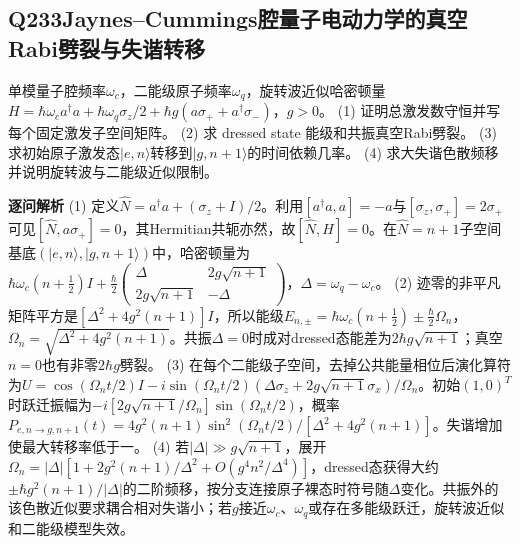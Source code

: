 \subsection*{Q233\quad Jaynes–Cummings腔量子电动力学的真空Rabi劈裂与失谐转移}
单模量子腔频率$\omega_c$，二能级原子频率$\omega_q$，旋转波近似哈密顿量$H=\hbar\omega_ca^\dagger a+\hbar\omega_q\sigma_z/2+\hbar g(a\sigma_++a^\dagger\sigma_-)$，$g>0$。
(1) 证明总激发数守恒并写每个固定激发子空间矩阵。
(2) 求 dressed state 能级和共振真空Rabi劈裂。
(3) 求初始原子激发态$|e,n\rangle$转移到$|g,n+1\rangle$的时间依赖几率。
(4) 求大失谐色散频移并说明旋转波与二能级近似限制。
\par\textbf{逐问解析}
(1) 定义$\hat N=a^\dagger a+(\sigma_z+I)/2$。利用$[a^\dagger a,a]=-a$与$[\sigma_z,\sigma_+]=2\sigma_+$可见$[\hat N,a\sigma_+]=0$，其Hermitian共轭亦然，故$[\hat N,H]=0$。在$\hat N=n+1$子空间基底$(|e,n\rangle,|g,n+1\rangle)$中，哈密顿量为$\hbar\omega_c(n+\tfrac12)I+\frac\hbar2\begin{pmatrix}\Delta&2g\sqrt{n+1}\\2g\sqrt{n+1}&-\Delta\end{pmatrix}$，$\Delta=\omega_q-\omega_c$。
(2) 迹零的非平凡矩阵平方是$[\Delta^2+4g^2(n+1)]I$，所以能级$E_{n,\pm}=\hbar\omega_c(n+\tfrac12)\pm\frac\hbar2\Omega_n$，$\Omega_n=\sqrt{\Delta^2+4g^2(n+1)}$。共振$\Delta=0$时成对dressed态能差为$2\hbar g\sqrt{n+1}$；真空$n=0$也有非零$2\hbar g$劈裂。
(3) 在每个二能级子空间，去掉公共能量相位后演化算符为$U=\cos(\Omega_nt/2)I-i\sin(\Omega_nt/2)(\Delta\sigma_z+2g\sqrt{n+1}\sigma_x)/\Omega_n$。初始$(1,0)^T$时跃迁振幅为$-i[2g\sqrt{n+1}/\Omega_n]\sin(\Omega_nt/2)$，概率$P_{e,n\to g,n+1}(t)=4g^2(n+1)\sin^2(\Omega_nt/2)/[\Delta^2+4g^2(n+1)]$。失谐增加使最大转移率低于一。
(4) 若$|\Delta|\gg g\sqrt{n+1}$，展开$\Omega_n=|\Delta|[1+2g^2(n+1)/\Delta^2+O(g^4n^2/\Delta^4)]$，dressed态获得大约$\pm\hbar g^2(n+1)/|\Delta|$的二阶频移，按分支连接原子裸态时符号随$\Delta$变化。共振外的该色散近似要求耦合相对失谐小；若$g$接近$\omega_c$、$\omega_q$或存在多能级跃迁，旋转波近似和二能级模型失效。
\par\medskip
